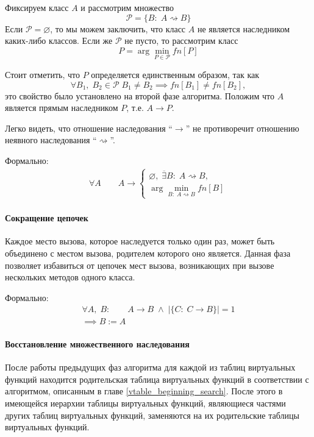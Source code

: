 \documentclass[a4paper,12pt,russian]{article}
\begin{document}
Фиксируем класс $A$ и рассмотрим множество \[\mathcal{P} = \{B:\; A \rightsquigarrow B\}\]
Если $\mathcal{P} = \varnothing$, то мы можем заключить, что класс $A$ не является наследником каких-либо классов. Если же $\mathcal{P}$ не пусто, то рассмотрим класс \[P = \arg \min_{P \in \mathcal{P}}fn[P]\]

Стоит отметить, что $P$ определяется единственным образом, так как \[\forall B_1,\;B_2 \in \mathcal{P}\; B_1 \neq B_2 \implies fn[B_1] \neq fn[B_2],\]
это свойство было установлено на второй фазе алгоритма.
Положим что $A$ является прямым наследником $P$, т.е. $A \rightarrow P$.

Легко видеть, что отношение наследования ``$\rightarrow$'' не противоречит отношению неявного наследования ``$\rightsquigarrow$''.

Формально:
\begin{eqnarray*}
\forall A\qquad A \rightarrow \begin{cases}
\varnothing,\; \overline{\exists} B:\; A \rightsquigarrow B,\\
\arg\min\limits_{B:\; A \rightsquigarrow B}fn[B]
\end{cases}
\end{eqnarray*}

\paragraph{Сокращение цепочек}
Каждое место вызова, которое наследуется только один раз, может быть объединено с местом вызова, родителем которого оно является.
Данная фаза позволяет избавиться от цепочек мест вызова, возникающих при вызове нескольких методов одного класса.

Формально:
\begin{eqnarray*}
\forall A,\;B:\qquad A \rightarrow B\;\wedge\;|\{C:\; C \rightarrow B\}| = 1\\
\implies B := A
\end{eqnarray*}

\paragraph{Восстановление множественного наследования}
После работы предыдущих фаз алгоритма для каждой из таблиц виртуальных функций находится родительская таблица виртуальных функций в соответствии с алгоритмом, описанным в главе \ref{vtable_beginning_search}.
После этого в имеющейся иерархии таблицы виртуальных функций, являющиеся частями других таблиц виртуальных функций, заменяются на их родительские таблицы виртуальных функций.
\end{document}
